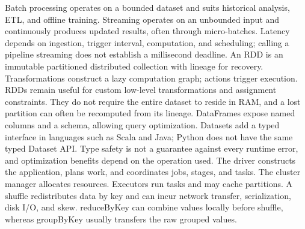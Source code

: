 \documentclass[11pt,a4paper]{article}
\begin{document}
Batch processing operates on a bounded dataset and suits historical analysis, ETL, and offline training. Streaming operates on an unbounded input and continuously produces updated results, often through micro-batches. Latency depends on ingestion, trigger interval, computation, and scheduling;\allowbreak{} calling a pipeline streaming does not establish a millisecond deadline. An RDD is an immutable partitioned distributed collection with lineage for recovery. Transformations construct a lazy computation graph;\allowbreak{} actions trigger execution. RDDs remain useful for custom low-level transformations and assignment constraints. They do not require the entire dataset to reside in RAM, and a lost partition can often be recomputed from its lineage. DataFrames expose named columns and a schema, allowing query optimization. Datasets add a typed interface in languages such as Scala and Java;\allowbreak{} Python does not have the same typed Dataset API. Type safety is not a guarantee against every runtime error, and optimization benefits depend on the operation used. The driver constructs the application, plans work, and coordinates jobs, stages, and tasks. The cluster manager allocates resources. Executors run tasks and may cache partitions. A shuffle redistributes data by key and can incur network transfer, serialization, disk I/\allowbreak{}O, and skew. reduceByKey can combine values locally before shuffle, whereas groupByKey usually transfers the raw grouped values.
\end{document}
